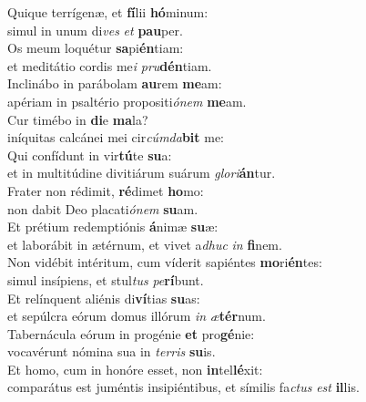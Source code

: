 \evenverse Quique terrígenæ, et \textbf{fí}lii \textbf{hó}minum:~\*\\
\evenverse simul in unum di\textit{ves} \textit{et} \textbf{pau}per.\\
\oddverse Os meum loquétur \textbf{sa}pi\textbf{én}tiam:~\*\\
\oddverse et meditátio cordis me\textit{i} \textit{pru}\textbf{dén}tiam.\\
\evenverse Inclinábo in parábolam \textbf{au}rem \textbf{me}am:~\*\\
\evenverse apériam in psaltério propositi\textit{ó}\textit{nem} \textbf{me}am.\\
\oddverse Cur timébo in \textbf{di}e \textbf{ma}la?~\*\\
\oddverse iníquitas calcánei mei cir\textit{cúm}\textit{da}\textbf{bit} me:\\
\evenverse Qui confídunt in vir\textbf{tú}te \textbf{su}a:~\*\\
\evenverse et in multitúdine divitiárum suárum \textit{glo}\textit{ri}\textbf{án}tur.\\
\oddverse Frater non rédimit, \textbf{ré}dimet \textbf{ho}mo:~\*\\
\oddverse non dabit Deo placati\textit{ó}\textit{nem} \textbf{su}am.\\
\evenverse Et prétium redemptiónis \textbf{á}nimæ \textbf{su}æ:~\*\\
\evenverse et laborábit in ætérnum, et vivet a\textit{dhuc} \textit{in} \textbf{fi}nem.\\
\oddverse Non vidébit intéritum, cum víderit sapiéntes \textbf{mo}ri\textbf{én}tes:~\*\\
\oddverse simul insípiens, et stul\textit{tus} \textit{pe}\textbf{rí}bunt.\\
\evenverse Et relínquent aliénis di\textbf{ví}tias \textbf{su}as:~\*\\
\evenverse et sepúlcra eórum domus illórum \textit{in} \textit{æ}\textbf{tér}num.\\
\oddverse Tabernácula eórum in progénie \textbf{et} pro\textbf{gé}nie:~\*\\
\oddverse vocavérunt nómina sua in \textit{ter}\textit{ris} \textbf{su}is.\\
\evenverse Et homo, cum in honóre esset, non \textbf{in}tel\textbf{lé}xit:~\*\\
\evenverse comparátus est juméntis insipiéntibus, et símilis fa\textit{ctus} \textit{est} \textbf{il}lis.\\
